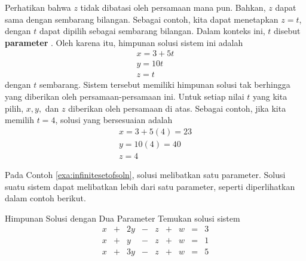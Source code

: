 \begin{solution}
Perhatikan bahwa $z$ tidak dibatasi oleh persamaan mana pun. Bahkan,
 $z$ dapat sama dengan sembarang bilangan. Sebagai contoh, kita dapat menetapkan $z = t$, dengan $t$ dapat dipilih sebagai sembarang bilangan.
Dalam konteks ini, $t$ disebut \textbf{parameter} . Oleh karena itu, himpunan
solusi sistem ini adalah
\[
\begin{array}{c}
x=3+5t \\
y=10t \\
z=t
\end{array}
\]
dengan $t$ sembarang. Sistem tersebut memiliki himpunan solusi tak berhingga yang diberikan oleh persamaan-persamaan ini. Untuk setiap nilai $t$ yang kita pilih,
$x, y,$ dan $z$ diberikan oleh persamaan di atas. Sebagai contoh, jika kita memilih $t=4$, solusi yang bersesuaian adalah
\[
\begin{array}{c}
x = 3 + 5 (4) = 23\\
y = 10(4)=40 \\
z=4
\end{array}
\]
\end{solution}

Pada Contoh \ref{exa:infinitesetofsoln}, solusi melibatkan satu parameter. Solusi
suatu sistem dapat melibatkan lebih dari satu parameter, seperti diperlihatkan dalam contoh berikut.

\begin{example}{Himpunan Solusi dengan Dua Parameter}\label{exa:twoparametersetofsoln}
Temukan solusi sistem
\begin{equation*}
\begin{array}{ccccccccc}
x&+&2y&-&z&+&w&=&3 \\
x&+&y&-&z&+&w&=&1 \\
x&+&3y&-&z&+&w&=&5
\end{array}
\end{equation*}
\end{example}

